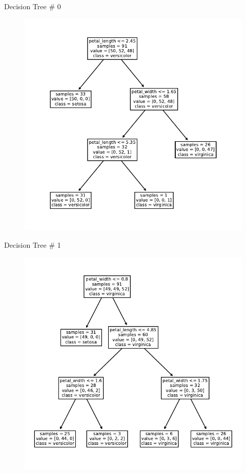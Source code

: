 \documentclass{beamer}
\begin{document}
\begin{frame}{Decision Tree \# 0}
  \begin{figure}
    \includegraphics[scale=0.7]{tree-0.pdf}
  \end{figure}
\end{frame}


\begin{frame}{Decision Tree \# 1}
  \begin{figure}
    \includegraphics[scale=0.7]{tree-1.pdf}
  \end{figure}
\end{frame}
\end{document}
